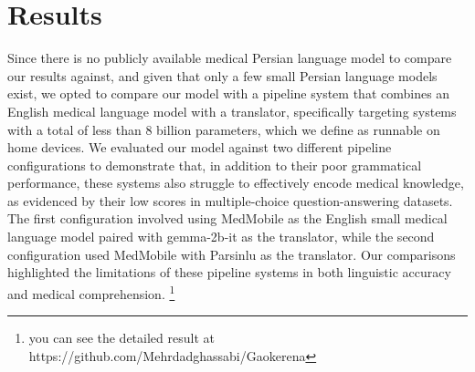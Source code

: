 \documentclass[conference]{IEEEtran}
\begin{document}
\section{Results}
Since there is no publicly available medical Persian language model to compare our results against, and given that only a few small Persian language models exist, we opted to compare our model with a pipeline system that combines an English medical language model with a translator, specifically targeting systems with a total of less than 8 billion parameters, which we define as runnable on home devices. We evaluated our model against two different pipeline configurations to demonstrate that, in addition to their poor grammatical performance, these systems also struggle to effectively encode medical knowledge, as evidenced by their low scores in multiple-choice question-answering datasets. The first configuration involved using MedMobile
\cite{b9}
as the English small medical language model paired with gemma-2b-it
\cite{b15}
as the translator, while the second configuration used MedMobile with Parsinlu
\cite{b16}
\cite{b17}
as the translator. Our comparisons highlighted the limitations of these pipeline systems in both linguistic accuracy and medical comprehension.
\footnote{
	you can see the detailed result at https://github.com/Mehrdadghassabi/Gaokerena
}
\end{document}

